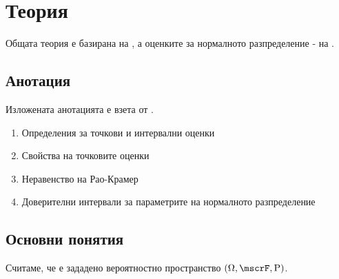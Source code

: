\documentclass{../../common/topic}
\begin{document}
\maketitle

\section{Теория}

Общата теория е базирана на \cite{DimitrovYanev}, а оценките за нормалното разпределение - на \cite{ASLectures}.

\subsection{Анотация}

Изложената анотацията е взета от \cite{Syllabus}.

\begin{enumerate}
  \item Определения за точкови и интервални оценки
  \item Свойства на точковите оценки
  \item Неравенство на Рао-Крамер
  \item Доверителни интервали за параметрите на нормалното разпределение
\end{enumerate}

\subsection{Основни понятия}

Считаме, че е зададено вероятностно пространство \( (\Omega, \mscrF, \Prob) \).
\end{document}
